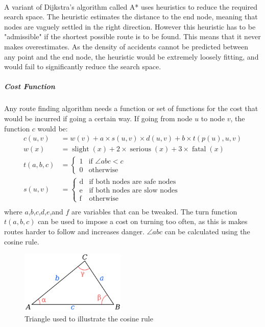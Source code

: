 \documentclass[11pt,twoside,a4paper]{article}
\begin{document}
\\A variant of Dijkstra's algorithm called A*\cite{Hart1968} uses heuristics to reduce the required search space. The heuristic estimates the distance to the end node, meaning that nodes are vaguely settled in the right direction.
However this heuristic has to be "admissible" if the shortest possible route is to be found. This means that it never makes overestimates. As the density of accidents cannot be predicted between any point and the end node, the heuristic would be extremely loosely fitting, and would 
fail to significantly reduce the search space. 
\subparagraph{Cost Function}
Any route finding algorithm needs a function or set of functions for the cost that would be incurred if going a certain way. If going from node $u$ to node $v$, the function $c$ would be:
\begin{align*}
    c(u,v) &= w(v) + a\times s(u,v)\times d(u,v) + b\times t(p(u),u,v)\\
    w(x) &= \operatorname{slight}(x) + 2 \times\operatorname{serious}(x) + 3\times\operatorname{fatal}(x)\\
    t(a,b,c) &=\begin{cases} \mbox{1} & \mbox{if } \angle abc < c \\ \mbox{0} & \mbox{otherwise} \end{cases}\\
    s(u,v) &=\begin{cases} \mbox{d} & \mbox{if } \text{both nodes are safe nodes} \\ \mbox{e} & \mbox{if both nodes are slow nodes}\\ \mbox{f} & \mbox{otherwise} \end{cases}\\
\end{align*}
where $a$,$b$,$c$,$d$,$e$,and $f$ are variables that can be tweaked. The turn function $t(a,b,c)$ can be used to impose a cost on turning too often, as this is makes routes harder to follow and increases danger. $\angle abc$ can be calculated 
using the cosine rule.
\begin{figure}[t]
    \begin{center}
    \includegraphics[width=5cm]{cosinediagram.png}
    \caption{Triangle used to illustrate the cosine rule \cite{cosinerulediagram}}
    \label{cosinediag}
    \end{center}
\end{figure}
\end{document}
